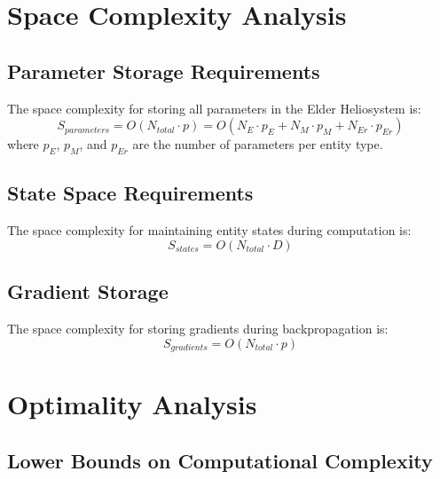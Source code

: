 \section{Space Complexity Analysis}

\subsection{Parameter Storage Requirements}

\begin{theorem}
The space complexity for storing all parameters in the Elder Heliosystem is:
\begin{equation}
S_{parameters} = O(N_{total} \cdot p) = O(N_E \cdot p_E + N_M \cdot p_M + N_{Er} \cdot p_{Er})
\end{equation}
where $p_E$, $p_M$, and $p_{Er}$ are the number of parameters per entity type.
\end{theorem}

\subsection{State Space Requirements}

\begin{theorem}
The space complexity for maintaining entity states during computation is:
\begin{equation}
S_{states} = O(N_{total} \cdot D)
\end{equation}
\end{theorem}

\subsection{Gradient Storage}

\begin{theorem}
The space complexity for storing gradients during backpropagation is:
\begin{equation}
S_{gradients} = O(N_{total} \cdot p)
\end{equation}
\end{theorem}

\section{Optimality Analysis}

\subsection{Lower Bounds on Computational Complexity}


